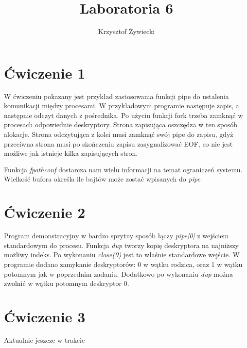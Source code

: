 \documentclass[a4paper, 12pt]{article}
\title{Laboratoria 6}
\author{Krzysztof Żywiecki}
\begin{document}
\maketitle

\section*{Ćwiczenie 1}

W ćwiczeniu pokazany jest przykład zastosowania funkcji pipe do ustalenia komunikacji między procesami. W przykładowym programie następuje zapis, a następnie odczyt danych z pośrednika. Po użyciu funkcji fork trzeba zamknąć w procesach odpowiednie deskryptory. Strona zapisująca oszczędza w ten sposób alokacje. Strona odczytująca z kolei musi zamknąć swój pipe do zapisu, gdyż przeciwna strona musi po skończeniu zapisu zasygnalizować EOF, co nie jest możliwe jak istnieje kilka zapisujących stron.

Funkcja \emph{fpathconf} dostarcza nam wielu informacji na temat ograniczeń systemu. Wielkość bufora określa ile bajtów może zostać wpisanych do \emph{pipe}

\section*{Ćwiczenie 2}
Program demonstracyjny w bardzo sprytny sposób łączy \emph{pipe[0]} z wejściem standardowym do procesu. Funkcja \emph{dup} tworzy kopię deskryptora na najniższy możliwy indeks. Po wykonaniu \emph{close(0)} jest to właśnie standardowe wejście. W programie dodano zamykanie deskryptorów: 0 w wątku rodzica, oraz 1 w wątku potomnym jak w poprzednim zadaniu. Dodatkowo po wykonaniu \emph{dup} można zwolnić w wątku potomnym deskryptor 0.

\section*{Ćwiczenie 3}
Aktualnie jeszcze w trakcie
\end{document}
